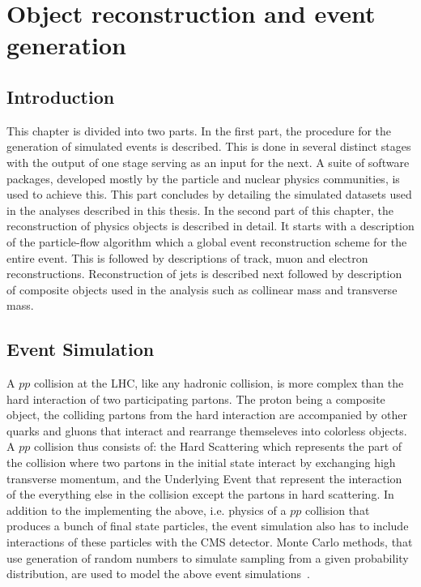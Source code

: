 
%
%

\chapter{Object reconstruction and event generation}
\label{chap:event_sim}
\section{Introduction}
\label{intro}
This chapter is divided into two parts. In the first part, the procedure for the generation of simulated events is described. This is done in several distinct stages with the output of one stage serving as an input for the next. A suite of software packages, developed mostly by the particle and nuclear physics communities, is used to achieve this. This part concludes by detailing the simulated datasets used in the analyses described in this thesis. In the second part of this chapter, the reconstruction of physics objects is described in detail. It starts with a description of the particle-flow algorithm which a global event reconstruction scheme for the entire event. This is followed by descriptions of track, muon and electron reconstructions. Reconstruction of jets is described next followed by description of composite objects used in the analysis such as collinear mass and transverse mass.
 

\section{Event Simulation}
A $pp$ collision at the LHC, like any hadronic collision, is more complex than the hard interaction of two participating partons. The proton being a composite object, the colliding partons from the hard interaction are accompanied by other quarks and gluons that interact and rearrange themseleves into colorless objects. A $pp$ collision thus consists of: the Hard Scattering which represents the part of the collision where two partons in the initial state interact by exchanging high transverse momentum, and the Underlying Event that represent the interaction of the everything else in the collision except the partons in hard scattering. In addition to the implementing the above, i.e. physics of a $pp$ collision  that produces a bunch of final state particles, the event simulation also has to include interactions of these particles with the CMS detector. Monte Carlo methods, that use generation of random numbers to simulate sampling from a given probability distribution, are used to model the above event simulations~\cite{mc_evtsim}.

